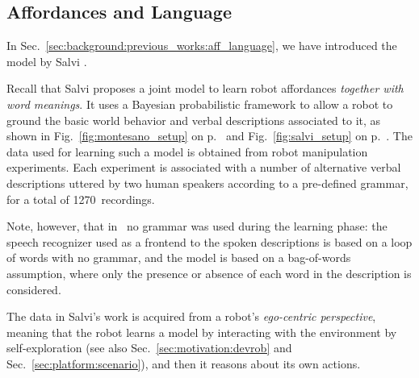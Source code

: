 \subsection{Affordances and Language}
\label{sec:gestures:related:salvi}

In Sec.~\ref{sec:background:previous_works:aff_language}, we have introduced the \AffWords{} model by Salvi \cite{salvi:2012:smcb}.

Recall that Salvi proposes a joint model to learn robot affordances \emph{together with word meanings}.
It uses a Bayesian probabilistic framework to allow a robot to ground the basic world behavior and verbal descriptions associated to it, as shown in Fig.~\ref{fig:montesano_setup} on p.~\pageref{fig:montesano_setup} and Fig.~\ref{fig:salvi_setup} on p.~\pageref{fig:salvi_setup}.
The data used for learning such a model is obtained from robot manipulation experiments.
Each experiment is associated with a number of alternative verbal descriptions uttered by two human speakers according to a pre-defined grammar, for a total of \num{1270}~recordings.

Note, however, that in~\cite{salvi:2012:smcb} no grammar was used during the learning phase:
the speech recognizer used as a frontend to the spoken descriptions is based on a loop of words with no grammar, and the \AffWords{} model is based on a bag-of-words assumption, where only the presence or absence of each word in the description is considered.

The data in Salvi's work is acquired from a robot's \emph{ego-centric perspective}, meaning that the robot learns a model by interacting with the environment by self-exploration (see also Sec.~\ref{sec:motivation:devrob} and Sec.~\ref{sec:platform:scenario}), and then it reasons about its own actions.

